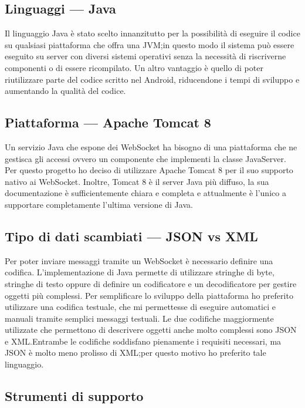 	\subsection{Linguaggi --- Java}
	Il linguaggio Java è stato scelto innanzitutto per la possibilità di eseguire il codice su qualsiasi piattaforma che offra una \gls{JVM};\@ in questo modo il sistema può essere eseguito su server con diversi sistemi operativi senza la necessità di riscriverne componenti o di essere ricompilato. Un altro vantaggio è quello di poter riutilizzare parte del codice scritto nel  Android, riducendone i tempi di sviluppo e aumentando la qualità del codice.

	\subsection{Piattaforma --- Apache Tomcat 8}
	Un servizio Java che espone dei WebSocket ha bisogno di una piattaforma che ne gestisca gli accessi ovvero un componente che implementi la classe JavaServer. Per questo progetto ho deciso di utilizzare Apache Tomcat 8 per il suo supporto nativo ai WebSocket. Inoltre, Tomcat 8 è il server Java  più diffuso, la sua documentazione è sufficientemente chiara e completa e attualmente è l'unico a supportare completamente l'ultima versione di Java.

	\subsection{Tipo di dati scambiati --- \gls{JSON} vs \gls{XML}}
	Per poter inviare messaggi tramite un WebSocket è necessario definire una codifica. L'implementazione  di Java permette di utilizzare stringhe di byte, stringhe di testo oppure di definire un codificatore e un decodificatore per gestire oggetti più complessi. Per semplificare lo sviluppo della piattaforma ho preferito utilizzare una codifica testuale, che mi permettesse di eseguire  automatici e manuali tramite semplici messaggi testuali. Le due codifiche maggiormente utilizzate che permettono di descrivere oggetti anche molto complessi sono \gls{JSON} e \gls{XML}.\@ Entrambe le codifiche soddisfano pienamente i requisiti necessari, ma \gls{JSON} è molto meno prolisso di \gls{XML};\@ per questo motivo ho preferito tale linguaggio.

	\subsection{Strumenti di supporto}
